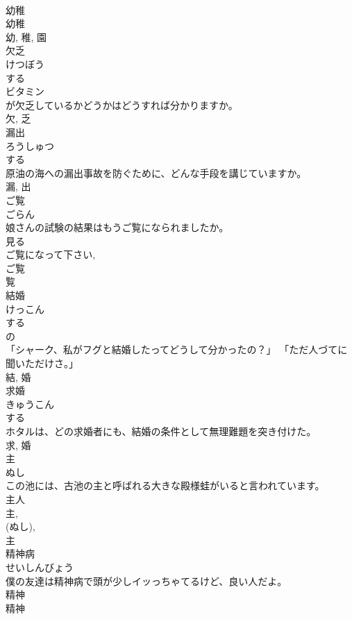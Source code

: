 \documentclass[8pt]{extreport}
\begin{document}
\begin{CJK}{UTF8}{min}
\\	幼稚 
\\	幼稚 
\\	幼, 稚, 園	
\\	欠乏	
\\	けつぼう	
\\	する 
\\	ビタミン
\\	が欠乏しているかどうかはどうすれば分かりますか。	
\\	欠, 乏	
\\	漏出	
\\	ろうしゅつ	
\\	する 
\\	原油の海への漏出事故を防ぐために、どんな手段を講じていますか。	
\\	漏, 出	
\\	ご覧	
\\	ごらん	
\\	娘さんの試験の結果はもうご覧になられましたか。	
\\	見る 
\\	ご覧になって下さい, 
\\	ご覧 
\\	覧	
\\	結婚	
\\	けっこん	
\\	する 
\\	の 
\\	「シャーク、私がフグと結婚したってどうして分かったの？」 「ただ人づてに聞いただけさ。」	
\\	結, 婚	
\\	求婚	
\\	きゅうこん	
\\	する 
\\	ホタルは、どの求婚者にも、結婚の条件として無理難題を突き付けた。	
\\	求, 婚	
\\	主	
\\	ぬし	
\\	この池には、古池の主と呼ばれる大きな殿様蛙がいると言われています。	
\\	主人 
\\	主, 
\\	(ぬし), 
\\	主	
\\	精神病	
\\	せいしんびょう	
\\	僕の友達は精神病で頭が少しイッっちゃてるけど、良い人だよ。	
\\	精神 
\\	精神 

\end{CJK}
\end{document}
